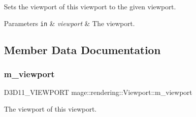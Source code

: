 Sets the viewport of this viewport to the given viewport.


\begin{DoxyParams}[1]{Parameters}
\mbox{\tt in}  & {\em viewport} & The viewport. \\
\hline
\end{DoxyParams}


\subsection{Member Data Documentation}
\mbox{\label{classmage_1_1rendering_1_1_viewport_ab0b20f21a771248d9e9659f1029a497d}} 
\subsubsection{\texorpdfstring{m\+\_\+viewport}{m\_viewport}}
{\footnotesize\ttfamily D3\+D11\+\_\+\+V\+I\+E\+W\+P\+O\+RT mage\+::rendering\+::\+Viewport\+::m\+\_\+viewport\hspace{0.3cm}{\ttfamily [private]}}

The viewport of this viewport. 